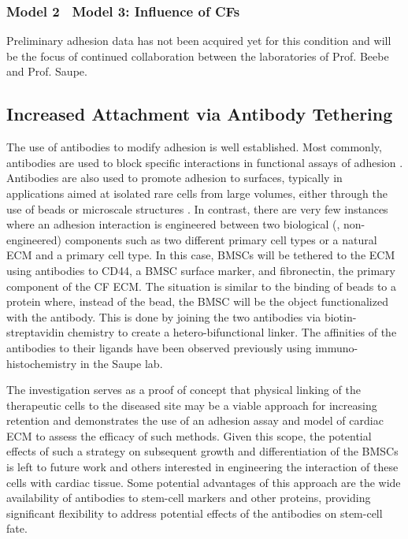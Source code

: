 

\subsubsection{Model 2 \vs\ Model 3: Influence of CFs}

Preliminary adhesion data has not been acquired yet for this condition and will be the focus of continued collaboration between the laboratories of Prof. Beebe and Prof. Saupe.

\subsection{Increased Attachment via Antibody Tethering}
The use of antibodies to modify adhesion is well established. Most commonly, antibodies are used to block specific interactions in functional assays of adhesion \cite{GIAVAZZI:1993ty}. Antibodies are also used to promote adhesion to surfaces, typically in applications aimed at isolated rare cells from large volumes, either through the use of beads or microscale structures \cite{Nagrath:2007bs,Cristofanilli:2004hp}. In contrast, there are very few instances where an adhesion interaction is engineered between two biological (\ie, non-engineered) components such as two different primary cell types or a natural ECM and a primary cell type. In this case, BMSCs will be tethered to the ECM using antibodies to CD44, a BMSC surface marker, and fibronectin, the primary component of the CF ECM. The situation is similar to the binding of beads to a protein where, instead of the bead, the BMSC will be the object functionalized with the antibody. This is done by joining the two antibodies via biotin-streptavidin chemistry to create a hetero-bifunctional linker. The affinities of the antibodies to their ligands have been observed previously using immuno-histochemistry in the Saupe lab. 

The investigation serves as a proof of concept that physical linking of the therapeutic cells to the diseased site may be a viable approach for increasing retention and demonstrates the use of an adhesion assay and model of cardiac ECM to assess the efficacy of such methods. Given this scope, the potential effects of such a strategy on subsequent growth and differentiation of the BMSCs is left to future work and others interested in engineering the interaction of these cells with cardiac tissue. Some potential advantages of this approach are the wide availability of antibodies to stem-cell markers and other proteins, providing significant flexibility to address potential effects of the antibodies on stem-cell fate.


